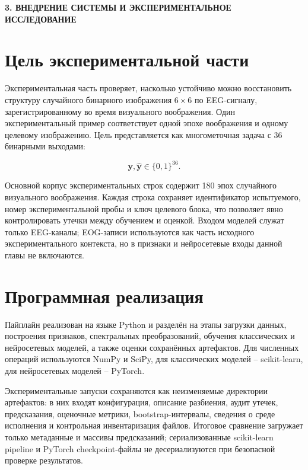 \newpage
\begin{center}
  \parbox{0.95\textwidth}{\centering\textbf{\large 3. ВНЕДРЕНИЕ СИСТЕМЫ И ЭКСПЕРИМЕНТАЛЬНОЕ ИССЛЕДОВАНИЕ}}
\end{center}

\section{Цель экспериментальной части}

Экспериментальная часть проверяет, насколько устойчиво можно восстановить
структуру случайного бинарного изображения $6 \times 6$ по EEG-сигналу,
зарегистрированному во время визуального воображения. Один экспериментальный
пример соответствует одной эпохе воображения и одному целевому изображению.
Цель представляется как многометочная задача с 36 бинарными выходами:

\begin{equation}
\mathbf{y}, \hat{\mathbf{y}} \in \{0,1\}^{36}.
\end{equation}

Основной корпус экспериментальных строк содержит 180 эпох случайного
визуального воображения. Каждая строка сохраняет идентификатор испытуемого,
номер экспериментальной пробы и ключ целевого блока, что позволяет явно
контролировать утечки между обучением и оценкой. Входом моделей служат только
EEG-каналы; EOG-записи используются как часть исходного экспериментального
контекста, но в признаки и нейросетевые входы данной главы не включаются.

\section{Программная реализация}

Пайплайн реализован на языке Python и разделён на этапы загрузки данных,
построения признаков, спектральных преобразований, обучения классических и
нейросетевых моделей, а также оценки сохранённых артефактов. Для численных
операций используются NumPy и SciPy, для классических моделей -- scikit-learn,
для нейросетевых моделей -- PyTorch.

Экспериментальные запуски сохраняются как неизменяемые директории артефактов:
в них входят конфигурация, описание разбиения, аудит утечек, предсказания,
оценочные метрики, bootstrap-интервалы, сведения о среде исполнения и
контрольная инвентаризация файлов. Итоговое сравнение загружает только
метаданные и массивы предсказаний; сериализованные scikit-learn pipeline и
PyTorch checkpoint-файлы не десериализуются при безопасной проверке результатов.


